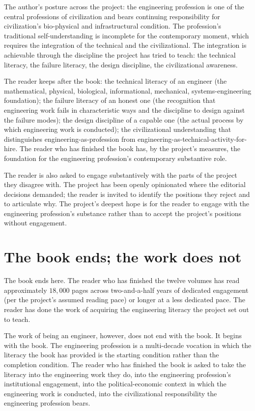 The author's posture across the project: the engineering profession is one of the central professions of civilization and bears continuing responsibility for civilization's bio-physical and infrastructural condition. The profession's traditional self-understanding is incomplete for the contemporary moment, which requires the integration of the technical and the civilizational. The integration is achievable through the discipline the project has tried to teach: the technical literacy, the failure literacy, the design discipline, the civilizational awareness.

The reader keeps after the book: the technical literacy of an engineer (the mathematical, physical, biological, informational, mechanical, systems-engineering foundation); the failure literacy of an honest one (the recognition that engineering work fails in characteristic ways and the discipline to design against the failure modes); the design discipline of a capable one (the actual process by which engineering work is conducted); the civilizational understanding that distinguishes engineering-as-profession from engineering-as-technical-activity-for-hire. The reader who has finished the book has, by the project's measures, the foundation for the engineering profession's contemporary substantive role.

The reader is also asked to engage substantively with the parts of the project they disagree with. The project has been openly opinionated where the editorial decisions demanded; the reader is invited to identify the positions they reject and to articulate why. The project's deepest hope is for the reader to engage with the engineering profession's substance rather than to accept the project's positions without engagement.

\section{The book ends; the work does not}

The book ends here. The reader who has finished the twelve volumes has read approximately $18{,}000$ pages across two-and-a-half years of dedicated engagement (per the project's assumed reading pace) or longer at a less dedicated pace. The reader has done the work of acquiring the engineering literacy the project set out to teach.

The work of being an engineer, however, does not end with the book. It begins with the book. The engineering profession is a multi-decade vocation in which the literacy the book has provided is the starting condition rather than the completion condition. The reader who has finished the book is asked to take the literacy into the engineering work they do, into the engineering profession's institutional engagement, into the political-economic context in which the engineering work is conducted, into the civilizational responsibility the engineering profession bears.

